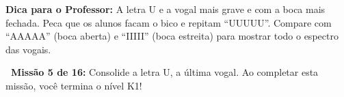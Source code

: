 \begin{dica}
\textbf{Dica para o Professor:} A letra U e a vogal mais grave e com a boca mais fechada. Peca que os alunos facam o bico e repitam ``UUUUU''. Compare com ``AAAAA'' (boca aberta) e ``IIIII'' (boca estreita) para mostrar todo o espectro das vogais.
\end{dica}





\begin{missao}
\textbf{\faGamepad~Miss\~a{}o 5 de 16:} Consolide a letra U, a \'ultima vogal. Ao completar esta miss\~a{}o, voc\^e termina o n\'ivel K1!
\end{missao}

